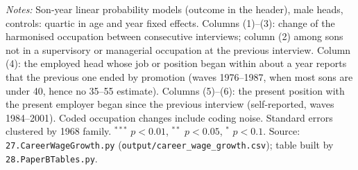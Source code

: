 \begin{table}[!htbp]
\begin{minipage}{\textwidth}\footnotesize \textit{Notes:} Son-year linear probability models (outcome in the header), male heads, controls: quartic in age and year fixed effects. Columns (1)--(3): change of the harmonised occupation between consecutive interviews; column (2) among sons not in a supervisory or managerial occupation at the previous interview. Column (4): the employed head whose job or position began within about a year reports that the previous one ended by promotion (waves 1976--1987, when most sons are under 40, hence no 35--55 estimate). Columns (5)--(6): the present position with the present employer began since the previous interview (self-reported, waves 1984--2001). Coded occupation changes include coding noise. Standard errors clustered by 1968 family. $^{***}$ $p<0.01$, $^{**}$ $p<0.05$, $^{*}$ $p<0.1$. Source: \texttt{27.CareerWageGrowth.py} (\texttt{output/career\_wage\_growth.csv}); table built by \texttt{28.PaperBTables.py}.\end{minipage}
\end{table}

